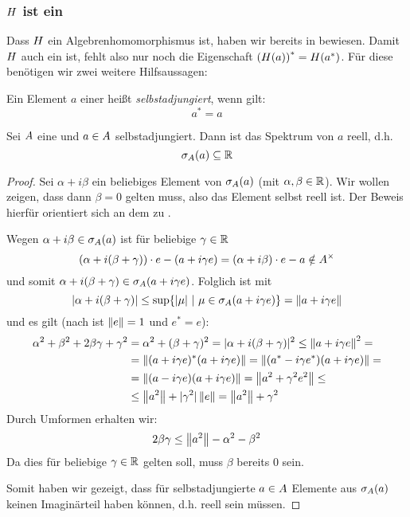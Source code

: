 \subsubsection{$H$ ist ein \CAlgHom}\label{sec:CAlgHom}

Dass $H$ ein Algebrenhomomorphismus ist, haben wir bereits in  bewiesen. Damit $H$ auch ein \CAlgHom{} ist, fehlt also nur noch die Eigenschaft $\left(H(a)\right)^* = H(a^*)$. Für diese benötigen wir zwei weitere Hilfsaussagen:

\begin{defn}[selbstadjungiert]\label{defn:selbstadjungiert}
Ein Element $a$ einer \CAlg{} heißt \emph{selbstadjungiert}, wenn gilt:
	\[a^* = a\]
\end{defn}

\begin{prop}\label{prop:Spektrum-reell}
Sei $A$ eine \CAlg{} und $a \in A$ selbstadjungiert. Dann ist das Spektrum von $a$ reell, d.h.
	\[\sigma_A(a) \subseteq \mathbb{R}\]
\end{prop}

\begin{proof}
Sei $\alpha + i\beta$ ein beliebiges Element von $\sigma_A(a)$ (mit $\alpha,\beta \in \mathbb{R}$). Wir wollen zeigen, dass dann $\beta = 0$ gelten muss, also das Element selbst reell ist. Der Beweis hierfür orientiert sich an dem zu \cite[Lemma IX.3.3(c)]{Werner2011}.

Wegen $\alpha +i\beta \in \sigma_A(a)$ ist	für beliebige $\gamma \in \mathbb{R}$
	\[(\alpha + i(\beta + \gamma))\cdot e - (a + i\gamma e) = (\alpha+i\beta)\cdot e - a \notin A^\times\]
und somit $\alpha + i(\beta + \gamma) \in \sigma_A(a+ i\gamma e)$. Folglich ist mit 
	\[|\alpha + i(\beta + \gamma)| \leq \sup\{|\mu| ~|~ \mu \in \sigma_A(a+ i\gamma e)\} = \left\lVert a+ i\gamma e\right\rVert\]
und es gilt (nach  ist $\left\lVert e\right\rVert = 1$ und $e^* = e$):
	\begin{align*}
	\alpha^2+\beta^2+2\beta\gamma+\gamma^2 &= \alpha^2 + (\beta+\gamma)^2 = |\alpha + i(\beta + \gamma)|^2 \leq \left\lVert a+ i\gamma e\right\rVert^2 = \\
	&= \left\lVert(a+ i\gamma e)^*(a+ i\gamma e)\right\rVert = \left\lVert(a^* - i\gamma e^*)(a+ i\gamma e)\right\rVert = \\
	&=\left\lVert(a - i\gamma e)(a+ i\gamma e)\right\rVert = \left\lVert a^2 + \gamma^2 e^2\right\rVert \leq \\
	&\leq \left\lVert a^2\right\rVert + |\gamma^2|\left\lVert e\right\rVert = \left\lVert a^2\right\rVert + \gamma^2
	\end{align*}
Durch Umformen erhalten wir:
	\[2\beta \gamma \leq \left\lVert a^2\right\rVert - \alpha^2 - \beta^2\]
Da dies für beliebige $\gamma \in \mathbb{R}$ gelten soll, muss $\beta$ bereits $0$ sein.

Somit haben wir gezeigt, dass für selbstadjungierte $a \in A$ Elemente aus $\sigma_A(a)$ keinen Imaginärteil haben können, d.h. reell sein müssen.
\end{proof}

